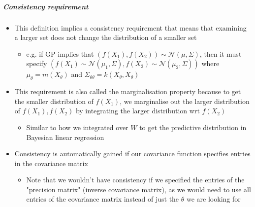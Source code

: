 \documentclass[12pt]{article}
\begin{document}
\subparagraph{Consistency requirement}
\begin{itemize}
    \item This definition implies a consistency requirement that means that examining a larger set does not change the distribution of a smaller set
        \begin{itemize}
            \item e.g. if GP implies that $(f(X_1), f(X_2)) \sim \mathcal{N}(\mu, \Sigma)$, then it must specify $(f(X_1) \sim \mathcal{N}(\mu_1, \Sigma), f(X_2) \sim \mathcal{N}(\mu_2, \Sigma))$ where $\mu_{\theta} = m(X_{\theta})$ and $\Sigma_{\theta\theta} = k(X_{\theta}, X_{\theta})$
        \end{itemize}
    \item This requirement is also called the marginalisation property because to get the smaller distribution of $f(X_1)$, we marginalise out the larger distribution of $f(X_1), f(X_2)$ by integrating the larger distribution wrt $f(X_2)$
        \begin{itemize}
            \item Similar to how we integrated over $W$ to get the predictive distribution in Bayesian linear regression
        \end{itemize}
    \item Consistency is automatically gained if our covariance function specifies entries in the covariance matrix
        \begin{itemize}
            \item Note that we wouldn't have consistency if we specified the entries of the "precision matrix" (inverse covariance matrix), as we would need to use all entries of the covariance matrix instead of just the $\theta$ we are looking for
        \end{itemize}
\end{itemize}
\end{document}
